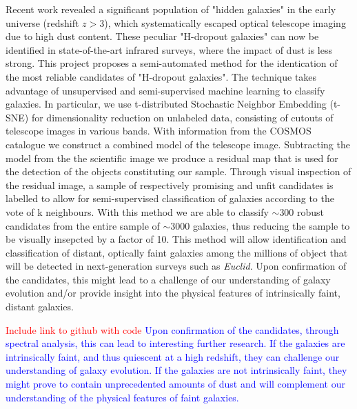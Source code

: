 Recent work revealed a significant population of "hidden galaxies" in the early universe (redshift $z>3$), which systematically escaped optical telescope imaging due to high dust content. These peculiar "H-dropout galaxies" can now be identified in state-of-the-art infrared surveys, where the impact of dust is less strong.
This project proposes a semi-automated method for the identication of the most reliable candidates of "H-dropout galaxies". The technique takes advantage of unsupervised and semi-supervised machine learning to classify galaxies. In particular, we use t-distributed Stochastic Neighbor Embedding (t-SNE) for dimensionality reduction on unlabeled data, consisting of cutouts of telescope images in various bands. With information from the COSMOS catalogue we construct a combined model of the telescope image. Subtracting the model from the the scientific image we produce a residual map that is used for the detection of the objects constituting our sample. Through visual inspection of the residual image, a sample of respectively promising and unfit candidates is labelled to allow for semi-supervised classification of galaxies according to the vote of k neighbours. With this method we are able to classify $\sim300$ robust candidates from the entire sample of $\sim3000$ galaxies, thus reducing the sample to be visually insepcted by a factor of 10. This method will allow identification and classification of distant, optically faint galaxies among the millions of object that will be detected in next-generation surveys such as \textit{Euclid}. Upon confirmation of the candidates, this might lead to a challenge of our understanding of galaxy evolution and/or provide insight into the physical features of intrinsically faint, distant galaxies.

\textcolor{red}{Include link to github with code}
\textcolor{blue}{Upon confirmation of the candidates, through spectral analysis, this can lead to interesting further research. If the galaxies are intrinsically faint, and thus quiescent at a high redshift, they can challenge our understanding of galaxy evolution. If the galaxies are not intrinsically faint, they might prove to contain unprecedented amounts of dust and will complement our understanding of the physical features of faint galaxies.}
